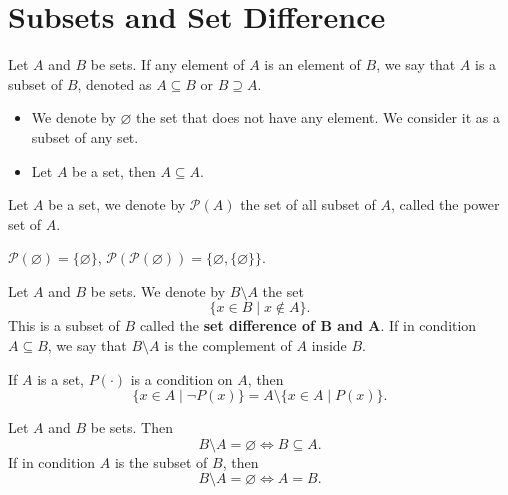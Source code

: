 \section{Subsets and Set Difference}
\begin{definitionenv}
    Let $A$ and $B$ be sets. If any element of $A$ is an element of $B$,  we say that $A$ is a subset of $B$, denoted as $A \subseteq B$ or $B\supseteq  A$.
\end{definitionenv}
\begin{exampleenv}
    \quad
   \begin{itemize}
    \item  We denote by $\varnothing $ the set that does not have any element. We consider it as a subset of any set.
    \item  Let $A$ be a set, then $A\subseteq A$.
    \end{itemize}
\end{exampleenv}
\begin{definitionenv}
    Let $A$ be a set, we denote by $\mathscr{P}  (A)$ the set of all subset of $A$,  called the power set of $A$.
\end{definitionenv}
\begin{exampleenv}
    $\mathscr{P} (\varnothing)=\{\varnothing\}$,
    $\mathscr{P} (\mathscr{P} (\varnothing))=\{\varnothing, \{\varnothing\}\}$.
\end{exampleenv}
\begin{definitionenv}
    Let $A$ and $B$ be sets. We denote by $B \setminus A$ the set $$\{x\in B\mid x\notin A\}.$$ This is a subset of $B$ called the \textbf{set difference of $\mathbf{B}$ and $\mathbf{A}$}.
    \newline
    If in condition $A \subseteq B$,  we say that $B\setminus A$ is the complement of $A$ inside $B$.
\end{definitionenv}
\begin{exampleenv}
    If $A$ is a set, $P(\cdot)$ is  a condition on $A$,  then
    $$\{x\in A \mid \neg P(x)\} = A\setminus\{x\in A\mid P(x)\}.$$
\end{exampleenv}
\begin{propositionenv}
    Let $A$ and $B$ be sets. Then $$B\setminus A=\varnothing \Leftrightarrow B\subseteq A.$$
    If in condition $A$ is the subset of $B$,  then $$B\setminus A=\varnothing \Leftrightarrow A=B.$$
\end{propositionenv}



